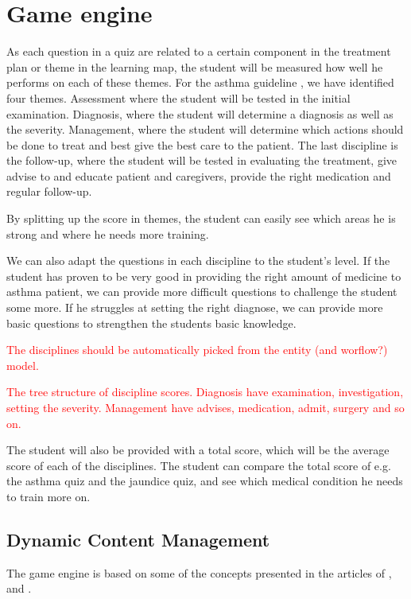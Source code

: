 \section{Game engine}



As each question in a quiz are related to a certain component in the treatment plan or theme in the learning map, the student will be measured how well he performs on each of these themes. For the asthma guideline \parencite{RepublicofKeny2016}, we have identified four themes. Assessment where the student will be tested in the initial examination. Diagnosis, where the student will determine a diagnosis as well as the severity. Management, where the student will determine which actions should be done to treat and best give the best care to the patient. The last discipline is the follow-up, where the student will be tested in evaluating the treatment, give advise to and educate patient and caregivers, provide the right medication and regular follow-up.

By splitting up the score in themes, the student can easily see which areas he is strong and where he needs more training. 



We can also adapt the questions in each discipline to the student's level. If the student has proven to be very good in providing the right amount of medicine to asthma patient, we can provide more difficult questions to challenge the student some more. If he struggles at setting the right diagnose, we can provide more basic questions to strengthen the students basic knowledge. 

\textcolor{red}{The disciplines should be automatically picked from the entity (and worflow?) model.}

\textcolor{red}{The tree structure of discipline scores. Diagnosis have examination, investigation, setting the severity. Management have advises, medication, admit, surgery and so on.}




The student will also be provided with a total score, which will be the average score of each of the disciplines. The student can compare the total score of e.g. the asthma quiz and the jaundice quiz, and see which medical condition he needs to train more on.


\subsection{Dynamic Content Management}
The game engine is based on some of the concepts presented in the articles of \textcite{Eide2008}, \textcite{Kristensen2011} and \textcite{Kristensen2013}.

